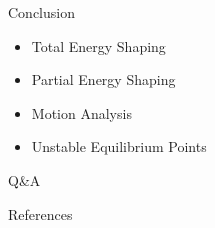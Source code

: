 \documentclass[10pt]{beamer}
\begin{document}
  \begin{frame}{Conclusion}
    \begin{itemize}
      \item Total Energy Shaping
      \item Partial Energy Shaping
      \item Motion Analysis
      \item Unstable Equilibrium Points
    \end{itemize}
  \end{frame}

  \begin{frame}[standout]
    Q\&A
  \end{frame}

  \appendix

  \begin{frame}{References}
    
    
  \end{frame}
\end{document}
